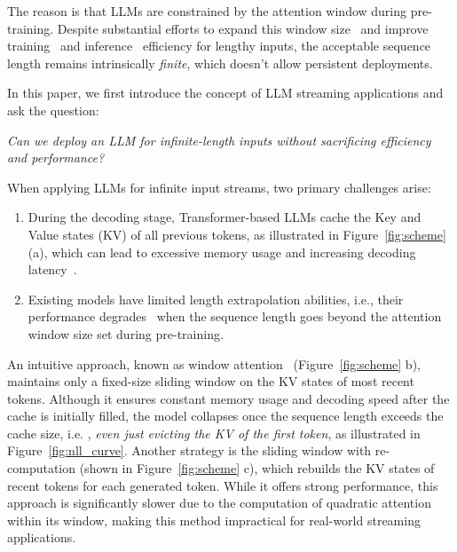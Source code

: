 The reason is that LLMs are constrained by the attention window during pre-training. Despite substantial efforts to expand this window size~\citep{chen2023extending,kaiokendev,peng2023yarn} and improve training~\citep{dao2022flashattention,dao2023flashattention2} and inference~\citep{pope2022efficiently,xiao2023smoothquant,anagnostidis2023dynamic,wang2021spatten,zhang2023h2o} efficiency for lengthy inputs, the acceptable sequence length remains intrinsically \emph{finite}, which doesn't allow persistent deployments.

In this paper, we first introduce the concept of LLM streaming applications and ask the question:

\begin{center}
   \emph{Can we deploy an LLM for infinite-length inputs without sacrificing efficiency and performance?} 
\end{center}

When applying LLMs for infinite input streams, two primary challenges arise:

\begin{enumerate}
    \item During the decoding stage, Transformer-based LLMs cache the Key and Value states (KV) of all previous tokens, as illustrated in Figure~\ref{fig:scheme} (a), which can lead to excessive memory usage and increasing decoding latency~\citep{pope2022efficiently}.
    \item Existing models have limited length extrapolation abilities, i.e., their performance degrades~\citep{alibi,chen2023extending} when the sequence length goes beyond the attention window size set during pre-training.
\end{enumerate}

An intuitive approach, known as window attention~\citep{beltagy2020longformer} (Figure~\ref{fig:scheme} b), maintains only a fixed-size sliding window on the KV states of most recent tokens. Although it ensures constant memory usage and decoding speed after the cache is initially filled, the model collapses once the sequence length exceeds the cache size, i.e. , \emph{even just evicting the KV of the first token}, as illustrated in Figure~\ref{fig:nll_curve}.
Another strategy is the sliding window with re-computation (shown in Figure~\ref{fig:scheme} c), which rebuilds the KV states of recent tokens for each generated token. While it offers strong performance, this approach is significantly slower due to the computation of quadratic attention within its window, making this method impractical for real-world streaming applications.

